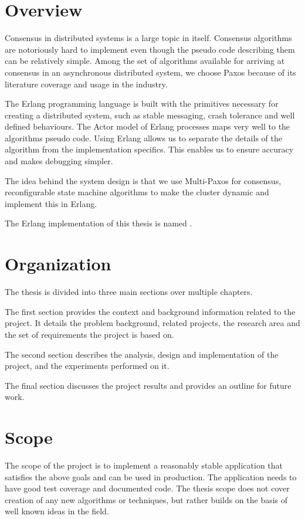 \section{Overview}

Consensus in distributed systems is a large topic in itself. Consensus
algorithms are notoriously hard to implement even though the pseudo code
describing them can be relatively simple. Among the set of algorithms
available for arriving at consensus in an asynchronous distributed
system, we choose Paxos because of its literature coverage and usage
in the industry.

The Erlang programming language is built with the primitives necessary for
creating a distributed system, such as stable messaging, crash tolerance and
well defined behaviours. The Actor model of Erlang processes maps very well to
the algorithms pseudo code. Using Erlang allows us to separate the details of
the algorithm from the implementation specifics. This enables us to ensure
accuracy and makes debugging simpler.

The idea behind the system design is that we use Multi-Paxos%
 for consensus, reconfigurable state machine algorithms to make the
cluster dynamic and implement this in Erlang.

The Erlang implementation of this thesis is named .

\section{Organization}
The thesis is divided into three main sections over multiple chapters.

The first section provides the context and background information related to the
project. It details the problem background, related projects, the research
area and the set of requirements the project is based on.

The second section describes the analysis, design and implementation of
the project, and the experiments performed on it.

The final section discusses the project results and provides an outline for
future work.

\section{Scope}

The scope of the project is to implement a reasonably stable application that
satisfies the above goals and can be used in production. The application needs
to have good test coverage and documented code. The thesis scope does not cover
creation of any new algorithms or techniques, but rather builds on the basis of
well known ideas in the field.

